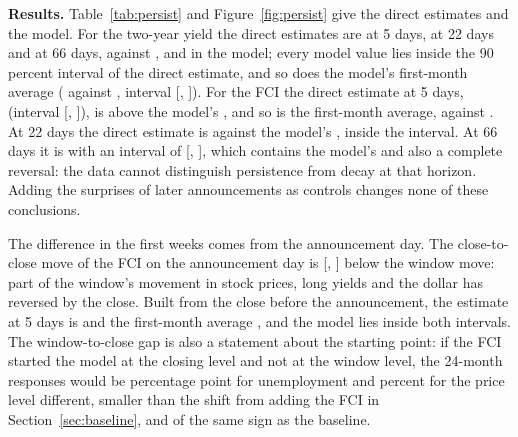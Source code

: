 \documentclass[11pt]{article}
\begin{document}
\begin{appendices}
\textbf{Results.} Table~\ref{tab:persist} and Figure~\ref{fig:persist} give the direct estimates and the model. For the two-year yield the direct estimates are  at 5 days,  at 22 days and  at 66 days, against ,  and  in the model; every model value lies inside the 90 percent interval of the direct estimate, and so does the model's first-month average ( against , interval [, ]). For the FCI the direct estimate at 5 days,  (interval [, ]), is above the model's , and so is the first-month average,  against . At 22 days the direct estimate is  against the model's , inside the interval. At 66 days it is  with an interval of [, ], which contains the model's  and also a complete reversal: the data cannot distinguish persistence from decay at that horizon. Adding the surprises of later announcements as controls changes none of these conclusions.

The difference in the first weeks comes from the announcement day. The close-to-close move of the FCI on the announcement day is  [, ] below the window move: part of the window's movement in stock prices, long yields and the dollar has reversed by the close. Built from the close before the announcement, the estimate at 5 days is  and the first-month average , and the model lies inside both intervals. The window-to-close gap is also a statement about the starting point: if the FCI started the model at the closing level and not at the window level, the 24-month responses would be  percentage point for unemployment and  percent for the price level different, smaller than the shift from adding the FCI in Section~\ref{sec:baseline}, and of the same sign as the baseline.


\end{appendices}
\end{document}
